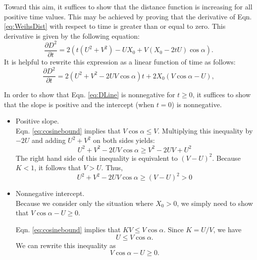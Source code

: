 \documentclass[12pt]{article}
\def\d{\partial}
\begin{document}
Toward this aim, it suffices to show that the distance function is increasing for all positive time values.
This may be achieved by proving that the derivative of Eqn. \ref{eq:WeihsDist} with respect to time is greater than or equal to zero. 
This derivative is given by the following equation:
%
\begin{equation}
\frac{\d D^2}{\d t}  = 2(t(U^2+V^2) - UX_0 + V(X_0-2tU)\cos\alpha).
\label{eq:distderivative}
\end{equation}  
%
It is helpful to rewrite this expression as a linear function of time as follows:
%
\begin{equation}
\frac{\d D^2}{\d t}  = 2(U^2+V^2-2UV\cos\alpha)t + 2X_0(V\cos\alpha -U), 
\label{eq:DLine}
\end{equation}
%


In order to show that Eqn. \ref{eq:DLine} is nonnegative for $t\geq0$, it suffices to show that the slope is positive and the intercept (when $t=0$) is nonnegative. 
%
\begin{itemize}
\item Positive slope. \\
Eqn. \ref{eq:cosinebound} implies that $V \cos\alpha \leq V$. 
Multiplying this inequality by $-2U$ and adding $U^2+V^2$ on both sides yields:
%
\begin{equation}
U^2+V^2 -2UV \cos\alpha \geq V^2 -2UV + U^2
\label{eq:slope}
\end{equation}
The right hand side of this inequality is equivalent to $(V-U)^2$. Because $K<1$, it follows that $V>U$. Thus,
%
\begin{equation}
U^2+V^2 - 2UV\cos\alpha \geq (V-U)^2 > 0 
\end{equation}

\item Nonnegative intercept. \\
Because we consider only the situation where $X_0 > 0$, we simply need to show that $V\cos \alpha -U \geq 0.$ 

Eqn. \ref{eq:cosinebound} implies that $KV \leq V \cos\alpha$. Since $K = U/V$, we have
%
\begin{equation}
U  \leq V\cos\alpha.
\end{equation}  
%
We can rewrite this inequality as 
%
\begin{equation}
V\cos\alpha - U \geq 0.
\label{eq:intercept}
\end{equation}
%
\end{itemize}
\end{document}
